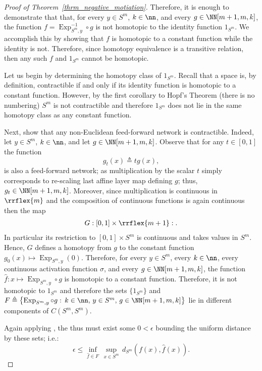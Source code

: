 \begin{proof}[{Proof of Theorem~\ref{thrm_negative_motiation}}]
Therefore, it is enough to demonstrate that that, for every $y \in S^m$, $k\in \nn$, and every $g \in \NN[m+1,m,k]$, the function $f=\operatorname{Exp}_{S^m,y}^{-1}\circ g$ is not homotopic to the identity function $1_{S^m}$.  We accomplish this by showing that $f$ is homotopic to a constant function while the identity is not.  Therefore, since homotopy equivalence is a transitive relation, then any such $f$ and $1_{S^m}$ cannot be homotopic.  

Let us begin by determining the homotopy class of $1_{S^m}$.  Recall that a space is, by definition, contractible if and only if its identity function is homotopic to a constant function.  However, by the first corollary to Hopf's Theorem \citep[page 125]{FuchsFomenkoHomotopicalTopology2016Edition2} (there is no numbering) $S^m$ is not contractible and therefore $1_{S^m}$ does not lie in the same homotopy class as any constant function.  

Next, show that any non-Euclidean feed-forward network is contractible.  Indeed, let $y \in S^m$, $k \in \nn$, and let $g\in \NN[m+1,m,k]$.  Observe that for any $t \in [0,1]$ the function 
$$
g_t(x)\triangleq tg(x),
$$
is also a feed-forward network; as multiplication by the scalar $t$ simply corresponds to re-scaling last affine layer map defining $g$; thus, $g_t \in \NN[m+1,m,k]$.  Moreover, since multiplication is continuous in $\rrflex{m}$ and the composition of continuous functions is again continuous then the map
$$
\begin{aligned}
 G:[0,1]\times \rrflex{m+1}:    
.
\end{aligned}
$$
In particular its restriction to $[0,1]\times S^m$ is continuous and takes values in $S^m$.  Hence, $G$ defines a homotopy from $g$ to the constant function $g_0(x)\mapsto \operatorname{Exp}_{S^m,y}(0)$.  Therefore, for every $y \in S^m$, every $k \in \nn$, every continuous activation function $\sigma$, and every $g\in \NN[m+1,m,k]$, 
the function $\hat{f}:x\mapsto \operatorname{Exp}_{S^m,y}\circ g$ is homotopic to a constant function.  Therefore, it is not homotopic to $1_{S^m}$ and therefore the sets $\{1_{S^m}\}$ and $F\triangleq \left\{\operatorname{Exp}_{S^m,y}\circ g:\, k\in \nn,\, y\in S^m,\, g \in \NN[m+1,m,k]\right\}$ lie in different components of $C(S^m,S^m)$.  

Again applying \citep[Theorem 46.8]{munkres2014topology}, the thus must exist some $0<\epsilon$ bounding the uniform distance by these sets; i.e.:
$$
\epsilon\leq 
\underset{{\hat{f}\in F}}{\inf}\,
\underset{x \in S^m}{\sup}
\,
d_{S^m}\left(
f(x), \hat{f}(x)
\right) 
.
$$
\end{proof}